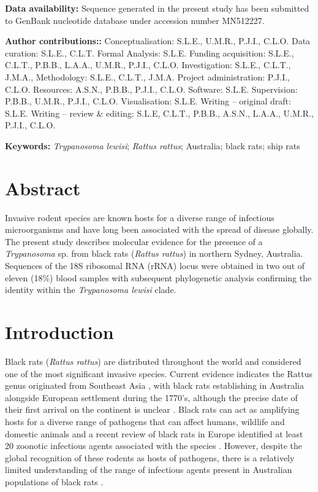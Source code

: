 \documentclass[a4paper, nobind]{templates/ociamthesis}
\begin{document}
\textbf{Data availability:}
Sequence generated in the present study has been submitted to GenBank nucleotide database under accession number MN512227.

\vspace{5mm}

\textbf{Author contributions::}
Conceptualisation: S.L.E., U.M.R., P.J.I., C.L.O.
Data curation: S.L.E., C.L.T.
Formal Analysis: S.L.E.
Funding acquisition: S.L.E., C.L.T., P.B.B., L.A.A., U.M.R., P.J.I., C.L.O.
Investigation: S.L.E., C.L.T., J.M.A.,
Methodology: S.L.E., C.L.T., J.M.A.
Project administration: P.J.I., C.L.O.
Resources: A.S.N., P.B.B., P.J.I., C.L.O.
Software: S.L.E.
Supervision: P.B.B., U.M.R., P.J.I., C.L.O.
Visualisation: S.L.E.
Writing -- original draft: S.L.E.
Writing -- review \& editing: S.L.E, C.L.T., P.B.B., A.S.N., L.A.A., U.M.R., P.J.I., C.L.O.

\vspace{5mm}

\textbf{Keywords:} \emph{Trypanosoma lewisi}; \emph{Rattus rattus}; Australia; black rats; ship rats

\newpage

\hypertarget{abstract-3}{%
\section{Abstract}\label{abstract-3}}

Invasive rodent species are known hosts for a diverse range of infectious microorganisms and have long been associated with the spread of disease globally. The present study describes molecular evidence for the presence of a \emph{Trypanosoma} sp. from black rats (\emph{Rattus rattus}) in northern Sydney, Australia. Sequences of the 18S ribosomal RNA (rRNA) locus were obtained in two out of eleven (18\%) blood samples with subsequent phylogenetic analysis confirming the identity within the \emph{Trypanosoma lewisi} clade.

\hypertarget{introduction-3}{%
\section{Introduction}\label{introduction-3}}

Black rats (\emph{Rattus rattus}) are distributed throughout the world and considered one of the most significant invasive species. Current evidence indicates the Rattus genus originated from Southeast Asia \autocite{aplinMultipleGeographicOrigins2011}, with black rats establishing in Australia alongside European settlement during the 1770's, although the precise date of their first arrival on the continent is unclear \autocite{banksReviewEvidencePotential2012}. Black rats can act as amplifying hosts for a diverse range of pathogens that can affect humans, wildlife and domestic animals and a recent review of black rats in Europe identified at least 20 zoonotic infectious agents associated with the species \autocite{strandRatborneDiseasesHorizon2019}. However, despite the global recognition of these rodents as hosts of pathogens, there is a relatively limited understanding of the range of infectious agents present in Australian populations of black rats \autocite{banksReviewEvidencePotential2012}.
\end{document}
